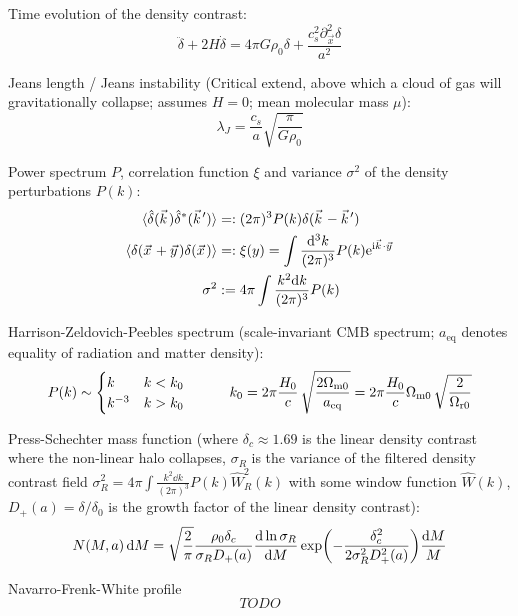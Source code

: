 		\noindent
		Time evolution of the density contrast:
		\begin{equation}
			\ddot{\delta} + 2 H \dot{\delta} = 4 \pi G \rho_0 \delta + \frac{c_s^2 \partial_{\vec{x}}^2 \delta}{a^2}
		\end{equation}

		\noindent
		Jeans length / Jeans instability (Critical extend, above which a cloud of gas will gravitationally collapse; assumes $H=0$; mean molecular mass $\mu$):
		\begin{equation}
			\lambda_J = \frac{c_s}{a} \sqrt{\frac{\pi}{G \rho_0}}
		\end{equation}

		\noindent
		Power spectrum $P$, correlation function $\xi$ and variance $\sigma^2$ of the density perturbations $P(k)$:
		\begin{align}
			\avg{\hat{\delta}(\vec{k}) \hat{\delta}^{*}(\vec{k}')} &=: (2\pi)^3 P(k) \delta (\vec{k}-\vec{k}') \\
			\avg{\delta(\vec{x} + \vec{y}) \delta(\vec{x})} &=: \xi(y) = \int \frac{\dd^3 k}{(2\pi)^3} P(k) \ex^{\i \vec{k} \cdot \vec{y}}\\
			\sigma^2 &:= 4\pi\int \frac{k^2 \dd k}{(2 \pi)^3} P(k)
		\end{align}

		\noindent
		Harrison-Zeldovich-Peebles spectrum (scale-invariant CMB spectrum; $a_{\text{eq}}$ denotes equality of radiation and matter density):
		\begin{equation}
			P(k) \sim 
			\begin{cases}
				k & k < k_0\\k^{-3} & k > k_0
			\end{cases}
			\hspace{30pt}
			k_0 = 2\pi{\frac{H_{0}}{c}}\,{\sqrt{\frac{2\Omega_{\mathrm{m0}}}{a_{\mathrm{eq}}}}}=2\pi{\frac{H_{0}}{c}}\Omega_{\mathrm{m0}}\,{\sqrt{\frac{2}{\Omega_{\mathrm{r0}}}}}
		\end{equation}

		\noindent
		Press-Schechter mass function (where $\delta_c \approx 1.69$ is the linear density contrast where the non-linear halo collapses, $\sigma_R$ is the variance of the filtered density contrast field $\sigma_R^2 = 4\pi\int\frac{k^2 \dd k}{(2\pi)^3} P(k) \hat{W}_R^2(k)$ with some window function $\hat{W}(k)$, $D_+(a) = \delta/\delta_0$ is the growth factor of the linear density contrast):
		\begin{equation}
			N(M,a) \,\dd M = \sqrt{\frac{2}{\pi}} \frac{\rho_0 \delta_c}{\sigma_R D_{+}(a)} \dv{\ln\sigma_R}{M} \exp(-\frac{\delta_c^2}{2 \sigma_R^2 D_{+}^2(a)}) \frac{\dd M}{M}
		\end{equation}

		\noindent
		Navarro-Frenk-White profile
		\begin{equation}
			TODO
		\end{equation}
